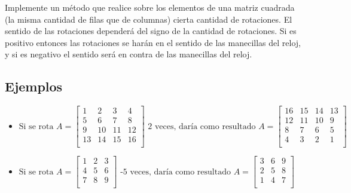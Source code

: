 Implemente un método que realice sobre los elementos de una matriz cuadrada (la misma cantidad de filas que de columnas) cierta cantidad de rotaciones. El sentido de las rotaciones dependerá del signo de la cantidad de rotaciones. Si es positivo entonces las rotaciones se harán en el sentido de las manecillas del reloj, y si es negativo el sentido será en contra de las manecillas del reloj.

\subsection*{Ejemplos}
\begin{itemize}
    \item \( \text{Si se rota } A = 
        \begin{bmatrix}
        1 & 2 & 3 & 4 \\
        5 & 6 & 7 & 8 \\
        9 & 10 & 11 & 12 \\
        13 & 14 & 15 & 16 \\
        \end{bmatrix}
        \text{ 2 veces, daría como resultado }
        A = 
        \begin{bmatrix}
        16 & 15 & 14 & 13 \\
        12 & 11 & 10 & 9 \\
        8 & 7 & 6 & 5 \\
        4 & 3 & 2 & 1 \\
        \end{bmatrix}
        \)
    \item \( \text{Si se rota } A = 
        \begin{bmatrix}
        1 & 2 & 3 \\
        4 & 5 & 6 \\
        7 & 8 & 9 \\
        \end{bmatrix}
        \text{ -5 veces, daría como resultado }
        A = 
        \begin{bmatrix}
        3 & 6 & 9 \\
        2 & 5 & 8 \\
        1 & 4 & 7 \\
        \end{bmatrix}
        \)
\end{itemize}
